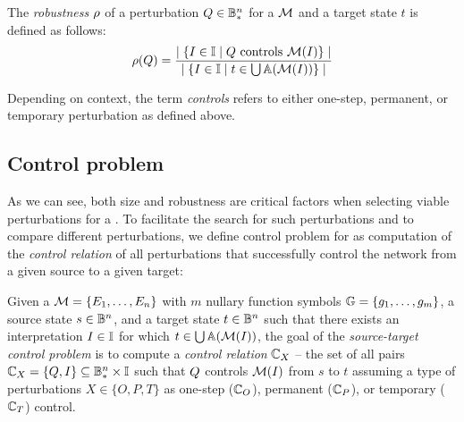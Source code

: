 \begin{definition}
	The \emph{robustness} $\rho$ of a perturbation $Q \in \mathbb{B}_{{*}}^n$ for a \PBN{} $\mathcal{M}$ and a target state $t$ is defined as follows:
	\begin{align*}
		\rho(Q) = \frac{\mid \{ I \in \mathbb{I} \mid Q~\text{\upshape controls}~\mathcal{M}(I) \} \mid}{\mid \{ I \in \mathbb{I} \mid t \in \bigcup \mathbb{A}(\mathcal{M}(I)) \} \mid}
	\end{align*}

	Depending on context, the term \emph{controls} refers to either one-step, permanent, or temporary perturbation as defined above.
\end{definition}

\subsection{Control problem}

As we can see, both size and robustness are critical factors when selecting viable perturbations for a \PBN{}. To facilitate the search for such perturbations and to compare different perturbations, we define control problem for \PBN{} as computation of the \emph{control relation} of all perturbations that successfully control the network from a given source to a given target:

\begin{definition}
\label{def:control_relation}
Given a \PBN{} $\mathcal{M} = \{E_1, \ldots, E_n\}$ with $m$ nullary function symbols $\mathbb{G} = \{g_1, \ldots, g_m \}$, a source state $s \in \mathbb{B}^n$, and a target state $t \in \mathbb{B}^n$ such that there exists an interpretation $I \in \mathbb{I}$ for which $t \in \bigcup \mathbb{A}(\mathcal{M}(I))$, the goal of the \emph{source-target control problem} is to compute a \emph{control relation} $\mathbb{C}_{X}$ -- the set of all pairs $\mathbb{C}_{X} = \{ Q, I \} \subseteq \mathbb{B}_{{*}}^n \times \mathbb{I}$ such that $Q$ controls $\mathcal{M}(I)$ from $s$ to $t$ assuming a type of perturbations $X \in \{ O, P, T \}$ as one-step ($\mathbb{C}_{O}$), permanent ($\mathbb{C}_{P}$), or temporary ($\mathbb{C}_{T}$) control.
\end{definition}

